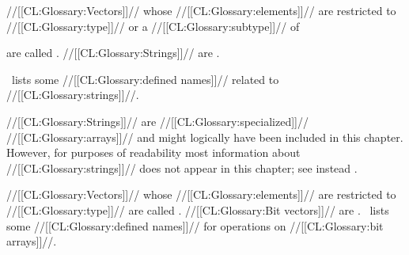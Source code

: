 

//[[CL:Glossary:Vectors]]// whose //[[CL:Glossary:elements]]// are restricted to //[[CL:Glossary:type]]//
 or a //[[CL:Glossary:subtype]]// of 

are called . 
//[[CL:Glossary:Strings]]// are .


\Thenextfigure\ lists some //[[CL:Glossary:defined names]]// related to //[[CL:Glossary:strings]]//.

//[[CL:Glossary:Strings]]// are //[[CL:Glossary:specialized]]// //[[CL:Glossary:arrays]]// 
and might logically have been included in this chapter.
However, for purposes of readability
most information about //[[CL:Glossary:strings]]// does not appear in this chapter;
see instead \chapref\Strings.







//[[CL:Glossary:Vectors]]// whose //[[CL:Glossary:elements]]// are restricted to //[[CL:Glossary:type]]//
 are called .
//[[CL:Glossary:Bit vectors]]// are .
\Thenextfigure\ lists some //[[CL:Glossary:defined names]]// for operations on //[[CL:Glossary:bit arrays]]//.


\endsubsubsection%

\endsubsection%
